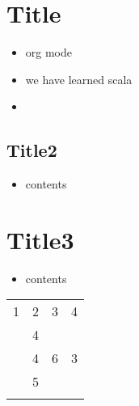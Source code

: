\documentclass[11pt]{article}
\author{宋剛秀}
\date{\today}
\title{}
\begin{document}
\tableofcontents

\section{Title}
\label{sec:orgheadline2}
\begin{itemize}
\item org mode
\item we have learned scala
\item 
\end{itemize}

\subsection{Title2}
\label{sec:orgheadline1}
\begin{itemize}
\item contents
\end{itemize}

\section{Title3}
\label{sec:orgheadline3}
\begin{itemize}
\item contents
\end{itemize}

\begin{center}
\begin{tabular}{rrrr}
1 & 2 & 3 & 4\\
 & 4 &  & \\
 & 4 & 6 & 3\\
 & 5 &  & \\
 &  &  & \\
\end{tabular}
\end{center}
\end{document}
